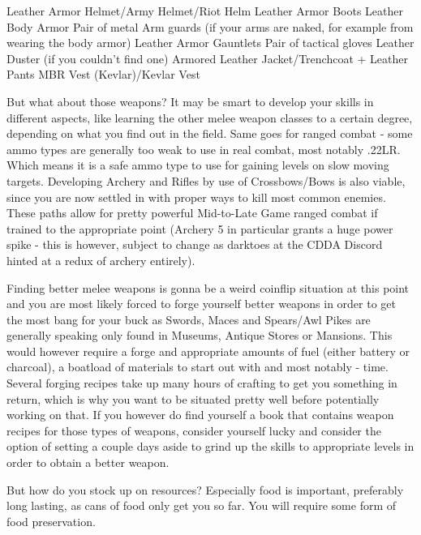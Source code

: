 Leather Armor Helmet/Army Helmet/Riot Helm
Leather Armor Boots
Leather Body Armor
Pair of metal Arm guards (if your arms are naked, for example from wearing the body armor)
Leather Armor Gauntlets
Pair of tactical gloves
Leather Duster (if you couldn't find one)
Armored Leather Jacket/Trenchcoat + Leather Pants
MBR Vest (Kevlar)/Kevlar Vest

But what about those weapons? It may be smart to develop your skills in different aspects, like learning the other melee weapon classes to a certain degree, depending on what you find out in the field. Same goes for ranged combat - some ammo types are generally too weak to use in real combat, most notably .22LR. Which means it is a safe ammo type to use for gaining levels on slow moving targets. Developing Archery and Rifles by use of Crossbows/Bows is also viable, since you are now settled in with proper ways to kill most common enemies. These paths allow for pretty powerful Mid-to-Late Game ranged combat if trained to the appropriate point (Archery 5 in particular grants a huge power spike - this is however, subject to change as darktoes at the CDDA Discord hinted at a redux of archery entirely).

Finding better melee weapons is gonna be a weird coinflip situation at this point and you are most likely forced to forge yourself better weapons in order to get the most bang for your buck as Swords, Maces and Spears/Awl Pikes are generally speaking only found in Museums, Antique Stores or Mansions. This would however require a forge and appropriate amounts of fuel (either battery or charcoal), a boatload of materials to start out with and most notably - time. Several forging recipes take up many hours of crafting to get you something in return, which is why you want to be situated pretty well before potentially working on that. If you however do find yourself a book that contains weapon recipes for those types of weapons, consider yourself lucky and consider the option of setting a couple days aside to grind up the skills to appropriate levels in order to obtain a better weapon.

But how do you stock up on resources? Especially food is important, preferably long lasting, as cans of food only get you so far. You will require some form of food preservation.

